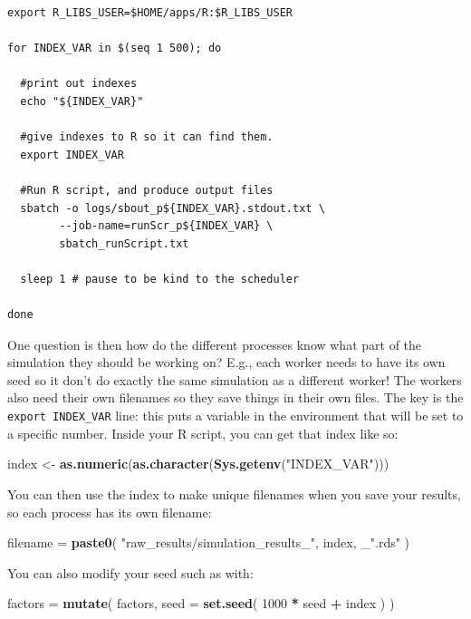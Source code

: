 \documentclass[
]{book}
\newenvironment{Shaded}{\begin{snugshade}}{\end{snugshade}}
\newcommand{\AttributeTok}[1]{\textcolor[rgb]{0.13,0.29,0.53}{#1}}
\newcommand{\DecValTok}[1]{\textcolor[rgb]{0.00,0.00,0.81}{#1}}
\newcommand{\FunctionTok}[1]{\textcolor[rgb]{0.13,0.29,0.53}{\textbf{#1}}}
\newcommand{\NormalTok}[1]{#1}
\newcommand{\OtherTok}[1]{\textcolor[rgb]{0.56,0.35,0.01}{#1}}
\newcommand{\SpecialCharTok}[1]{\textcolor[rgb]{0.81,0.36,0.00}{\textbf{#1}}}
\newcommand{\StringTok}[1]{\textcolor[rgb]{0.31,0.60,0.02}{#1}}
\begin{document}
\begin{verbatim}
export R_LIBS_USER=$HOME/apps/R:$R_LIBS_USER

for INDEX_VAR in $(seq 1 500); do

  #print out indexes
  echo "${INDEX_VAR}"

  #give indexes to R so it can find them.
  export INDEX_VAR 

  #Run R script, and produce output files
  sbatch -o logs/sbout_p${INDEX_VAR}.stdout.txt \
        --job-name=runScr_p${INDEX_VAR} \
        sbatch_runScript.txt
  
  sleep 1 # pause to be kind to the scheduler

done
\end{verbatim}

One question is then how do the different processes know what part of the simulation they should be working on?
E.g., each worker needs to have its own seed so it don't do exactly the same simulation as a different worker!
The workers also need their own filenames so they save things in their own files.
The key is the \texttt{export\ INDEX\_VAR} line: this puts a variable in the environment that will be set to a specific number.
Inside your R script, you can get that index like so:

\begin{Shaded}
\begin{Highlighting}[]
\NormalTok{index }\OtherTok{\textless{}{-}} \FunctionTok{as.numeric}\NormalTok{(}\FunctionTok{as.character}\NormalTok{(}\FunctionTok{Sys.getenv}\NormalTok{(}\StringTok{"INDEX\_VAR"}\NormalTok{)))}
\end{Highlighting}
\end{Shaded}

You can then use the index to make unique filenames when you save your results, so each process has its own filename:

\begin{Shaded}
\begin{Highlighting}[]
\NormalTok{filename }\OtherTok{=} \FunctionTok{paste0}\NormalTok{( }\StringTok{"raw\_results/simulation\_results\_"}\NormalTok{, index, \_}\StringTok{".rds"}\NormalTok{ )}
\end{Highlighting}
\end{Shaded}

You can also modify your seed such as with:

\begin{Shaded}
\begin{Highlighting}[]
\NormalTok{factors }\OtherTok{=} \FunctionTok{mutate}\NormalTok{( factors,}
                  \AttributeTok{seed =} \FunctionTok{set.seed}\NormalTok{( }\DecValTok{1000} \SpecialCharTok{*}\NormalTok{ seed }\SpecialCharTok{+}\NormalTok{ index ) )}
\end{Highlighting}
\end{Shaded}
\end{document}
